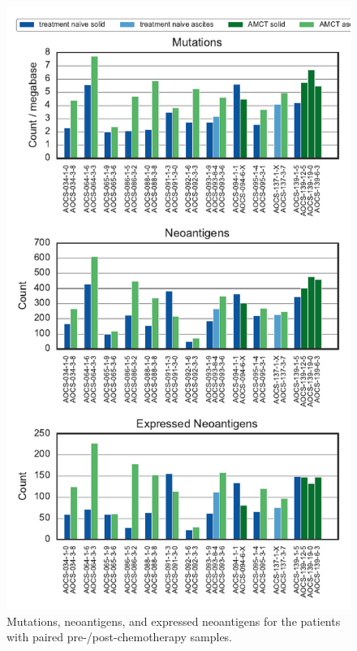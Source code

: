 \begin{figure}
\centering
\includegraphics[scale=1.0]{figures/paired_counts.pdf}
\caption{Mutations, neoantigens, and expressed neoantigens for the patients with paired pre-/post-chemotherapy samples.}
\label{fig:supp_paired}
\end{figure}

